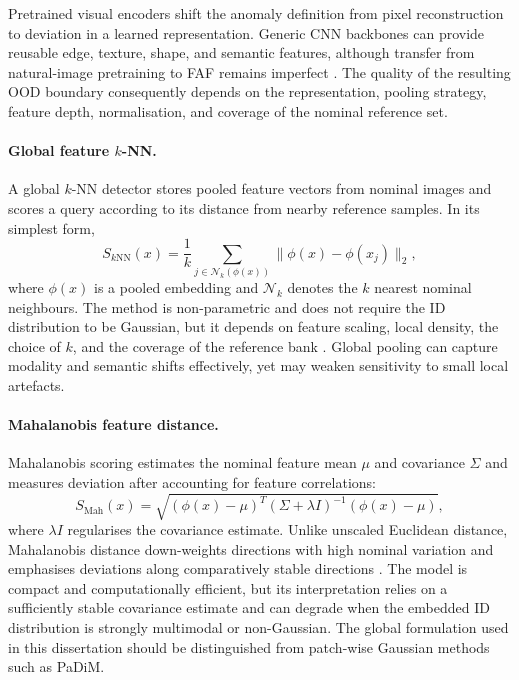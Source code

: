 \documentclass[fleqn,12pt]{olplainarticle}
\begin{document}
Pretrained visual encoders shift the anomaly definition from pixel reconstruction to deviation in a learned representation. Generic CNN backbones can provide reusable edge, texture, shape, and semantic features, although transfer from natural-image pretraining to FAF remains imperfect \cite{yosinski2014transferable}. The quality of the resulting OOD boundary consequently depends on the representation, pooling strategy, feature depth, normalisation, and coverage of the nominal reference set.

\paragraph{Global feature $k$-NN.}
A global $k$-NN detector stores pooled feature vectors from nominal images and scores a query according to its distance from nearby reference samples. In its simplest form,
\begin{equation}
    S_{k\mathrm{NN}}(x)=\frac{1}{k}\sum_{j\in\mathcal{N}_k(\phi(x))}
    \lVert \phi(x)-\phi(x_j)\rVert_2,
\end{equation}
where $\phi(x)$ is a pooled embedding and $\mathcal{N}_k$ denotes the $k$ nearest nominal neighbours. The method is non-parametric and does not require the ID distribution to be Gaussian, but it depends on feature scaling, local density, the choice of $k$, and the coverage of the reference bank \cite{araujo2023fewshot,ahmadian2024novelty}. Global pooling can capture modality and semantic shifts effectively, yet may weaken sensitivity to small local artefacts.

\paragraph{Mahalanobis feature distance.}
Mahalanobis scoring estimates the nominal feature mean $\mu$ and covariance $\Sigma$ and measures deviation after accounting for feature correlations:
\begin{equation}
    S_{\mathrm{Mah}}(x)=
    \sqrt{\left(\phi(x)-\mu\right)^{T}
    \left(\Sigma+\lambda I\right)^{-1}
    \left(\phi(x)-\mu\right)},
    \label{eq:mahalanobis_score}
\end{equation}
where $\lambda I$ regularises the covariance estimate. Unlike unscaled Euclidean distance, Mahalanobis distance down-weights directions with high nominal variation and emphasises deviations along comparatively stable directions \cite{lee2018mahalanobis}. The model is compact and computationally efficient, but its interpretation relies on a sufficiently stable covariance estimate and can degrade when the embedded ID distribution is strongly multimodal or non-Gaussian. The global formulation used in this dissertation should be distinguished from patch-wise Gaussian methods such as PaDiM.
\end{document}
